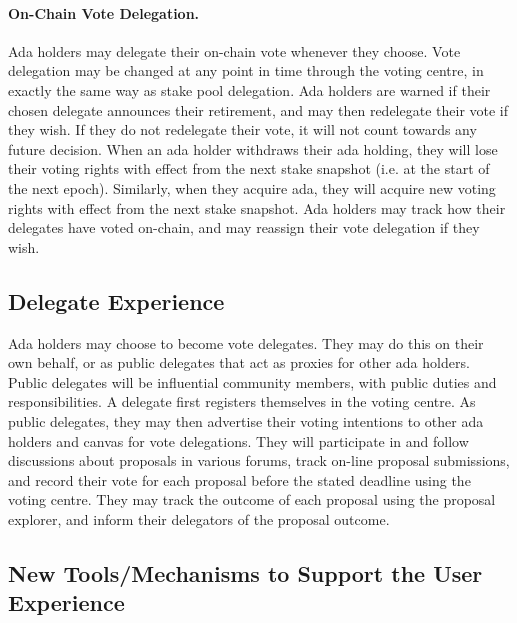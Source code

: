 \paragraph{On-Chain Vote Delegation.}

Ada holders may delegate their on-chain vote whenever they choose.  Vote delegation may be changed at any point in time through the voting centre, in
exactly the same way as stake pool delegation.  Ada holders are warned if their chosen delegate announces their retirement, and may then redelegate their vote if they
wish.  If they do not redelegate their vote, it will not count towards any future decision.
When an ada holder withdraws their ada holding, they will lose their voting rights with effect from the next stake snapshot (i.e. at the start of the next
epoch).  Similarly, when they acquire ada, they will acquire new voting rights with effect from the next stake snapshot.
Ada holders may track how their delegates have voted on-chain, and may reassign their vote delegation if they wish.

\subsection{Delegate Experience}

Ada holders may choose to become vote delegates.  They may do this on their own behalf, or as public delegates that act as proxies for other ada holders.
Public delegates will be influential community members, with public duties and responsibilities.
A delegate first registers themselves in the voting centre.  As public delegates, they may then advertise their voting intentions to other ada holders and canvas for vote delegations.
They will participate in and follow discussions about proposals in various forums, track on-line proposal submissions, and
record their vote for each proposal before the stated deadline using the voting centre.  They may track the outcome of each proposal using the proposal explorer, and inform their
delegators of the proposal outcome.

\subsection{New Tools/Mechanisms to Support the User Experience}

